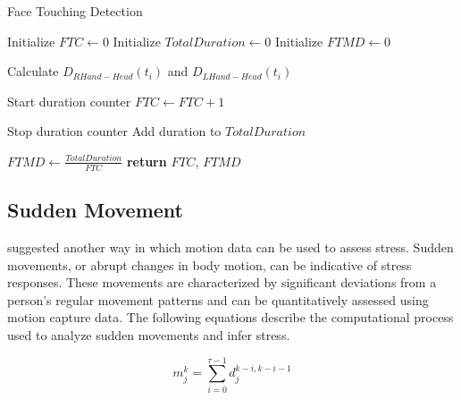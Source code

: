     \begin{algorithm}
        \caption{Face Touching Detection}
          \label{alg:face_touching}
        \begin{algorithmic}[1]
          \Statex
            \State Initialize $FTC \gets 0$ 
            \State Initialize $TotalDuration \gets 0$ 
            \State Initialize $FTMD \gets 0$ 
            
              \State Calculate $D_{RHand-Head}(t_i)$ and $D_{LHand-Head}(t_i)$
              
                \State Start duration counter
                \State $FTC \gets FTC + 1$
              \EndIf
              
                \State Stop duration counter
                \State Add duration to $TotalDuration$
              \EndIf
            \EndFor
            
                \State $FTMD \gets \frac{TotalDuration}{FTC}$ 
            \EndIf
            \State \textbf{return} $FTC$, $FTMD$
          \EndFunction
        \end{algorithmic}
      \end{algorithm}

      
\subsection*{Sudden Movement }
\label{subsec:sudden_movement_analysis}

\textcite{hyperactivity} suggested another way in which motion data can be used to assess stress.
Sudden movements, or abrupt changes in body motion, can be indicative of stress responses. These movements are characterized by significant deviations from a person's regular movement patterns and can be quantitatively assessed using motion capture data. The following equations describe the computational process used to analyze sudden movements and infer stress.

\begin{equation}
m_j^k = \sum_{i=0}^{\tau-1} d_j^{k-i,k-i-1}
\label{eq:movement_joints}
\end{equation}

